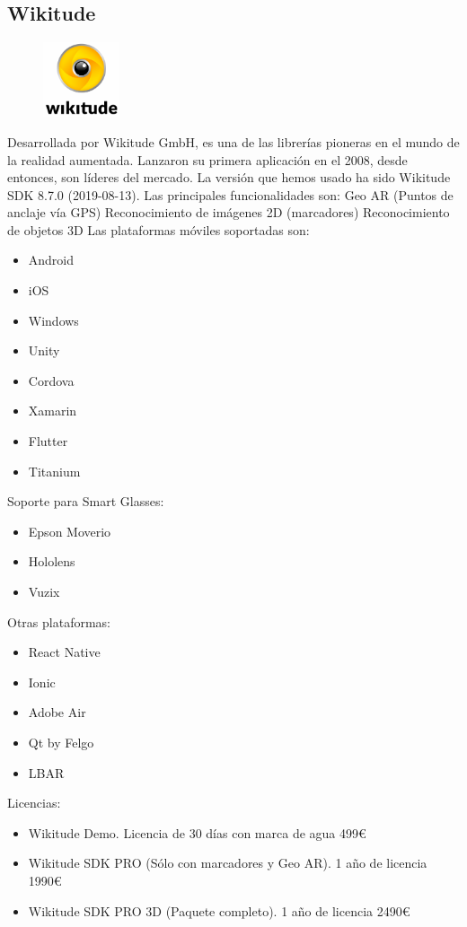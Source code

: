 \subsection{Wikitude}
\begin{figure}[H]
    \centering
    \includegraphics[width=0.2\textwidth]{Images/Wikitude_Logo.png}
    \label{fig:Wikitude}
\end{figure}
Desarrollada por Wikitude GmbH, es una de las librerías pioneras en el mundo de la realidad aumentada. Lanzaron su primera aplicación en el 2008, desde entonces, son líderes del mercado. La versión que hemos usado ha sido Wikitude SDK 8.7.0 (2019-08-13).\cite{Wikitude}
Las principales funcionalidades son:
Geo AR (Puntos de anclaje vía GPS)
Reconocimiento de imágenes 2D (marcadores) 
Reconocimiento de objetos 3D
Las plataformas móviles soportadas son:
\begin{itemize}
\item Android
\item iOS
\item Windows
\item Unity
\item Cordova
\item Xamarin
\item Flutter
\item Titanium
\end{itemize}
Soporte para Smart Glasses:
\begin{itemize}
\item Epson Moverio
\item Hololens
\item Vuzix
\end{itemize}
Otras plataformas:
\begin{itemize}
\item React Native
\item Ionic
\item Adobe Air
\item Qt by Felgo
\item LBAR
\end{itemize}
Licencias:
\begin{itemize}
\item Wikitude Demo. Licencia de 30 días con marca de agua 499€
\item Wikitude SDK PRO (Sólo con marcadores y Geo AR). 1 año de licencia 1990€
\item Wikitude SDK PRO 3D (Paquete completo). 1 año de licencia 2490€
\end{itemize}

